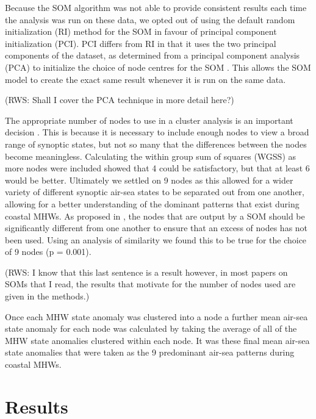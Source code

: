\documentclass[a4paper,10pt,review]{elsarticle}
\begin{document}
Because the SOM algorithm was not able to provide consistent results each time the analysis was run on these data, we opted out of using the default random initialization (RI) method for the SOM in favour of principal component initialization (PCI). PCI differs from RI in that it uses the two principal components of the dataset, as determined from a principal component analysis (PCA) to initialize the choice of node centres for the SOM \citep{Akinduko2016}. This allows the SOM model to create the exact same result whenever it is run on the same data. 

(RWS: Shall I cover the PCA technique in more detail here?)

The appropriate number of nodes to use in a cluster analysis is an important decision \citep{Gibson2016a}. This is because it is necessary to include enough nodes to view a broad range of synoptic states, but not so many that the differences between the nodes become meaningless. Calculating the within group sum of squares (WGSS) as more nodes were included showed that 4 could be satisfactory, but that at least 6 would be better. Ultimately we settled on 9 nodes as this allowed for a wider variety of different synoptic air-sea states to be separated out from one another, allowing for a better understanding of the dominant patterns that exist during coastal MHWs. As proposed in \citet{Johnson2013}, the nodes that are output by a SOM should be significantly different from one another to ensure that an excess of nodes has not been used. Using an analysis of similarity we found this to be true for the choice of 9 nodes (p = 0.001). 

(RWS: I know that this last sentence is a result however, in most papers on SOMs that I read, the results that motivate for the number of nodes used are given in the methods.)

Once each MHW state anomaly was clustered into a node a further mean air-sea state anomaly for each node was calculated by taking the average of all of the MHW state anomalies clustered within each node. It was these final mean air-sea state anomalies that were taken as the 9 predominant air-sea patterns during coastal MHWs.

\section{Results}
\end{document}
